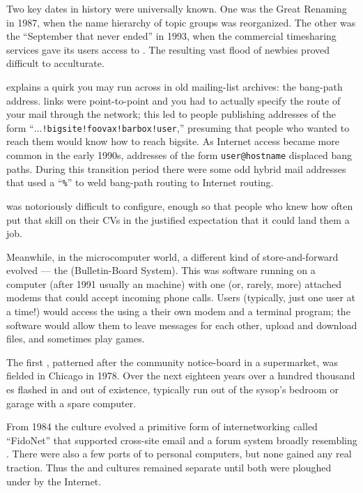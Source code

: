 Two key dates in  history were universally known. One was the Great
Renaming in 1987, when the name hierarchy of  topic groups was
reorganized. The other was the ``September that never ended'' in 1993, when the
 commercial timesharing services gave its users access to . The
resulting vast flood of newbies proved difficult to acculturate.

 explains a quirk you may run across in old mailing-list archives: the
bang-path address.  links were point-to-point and you had to actually
specify the route of your mail through the  network; this led to people
publishing addresses of the form ``$\ldots${\tt !bigsite!foovax!barbox!user},'' presuming that
people who wanted to reach them would know how to reach bigsite. As Internet
access became more common in the early 1990s, addresses of the form
{\tt user@hostname} displaced bang paths. During this transition period there were
some odd hybrid mail addresses that used a ``{\tt \%}'' to weld bang-path routing to
Internet routing.

 was notoriously difficult to configure, enough so that people who knew how
often put that skill on their CVs in the justified expectation that it could
land them a job.

Meanwhile, in the microcomputer world, a different kind of store-and-forward
evolved --- the  (Bulletin-Board System). This was software running on a
computer (after 1991 usually an  machine) with one (or, rarely, more)
attached modems that could accept incoming phone calls. Users (typically, just
one user at a time!) would access the  using a their own modem and a
terminal program; the  software would allow them to leave messages for each
other, upload and download files, and sometimes play games.

The first , patterned after the community notice-board in a supermarket, was
fielded in Chicago in 1978. Over the next eighteen years over a hundred
thousand es flashed in and out of existence, typically run out of the
sysop's bedroom or garage with a spare computer.

From 1984 the  culture evolved a primitive form of internetworking called
``FidoNet'' that supported cross-site email and a forum system broadly resembling
. There were also a few ports of  to  personal computers, but none
gained any real traction. Thus the  and  cultures remained separate
until both were ploughed under by the Internet.

